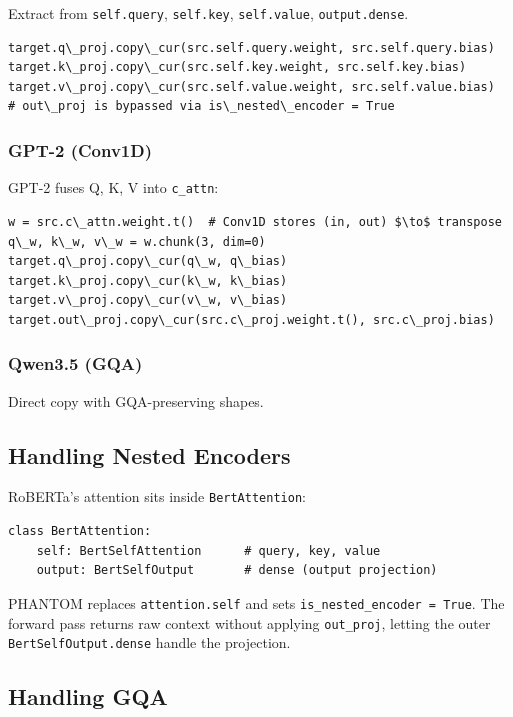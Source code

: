 Extract from \texttt{self.query}, \texttt{self.key}, \texttt{self.value}, \texttt{output.dense}.

\begin{lstlisting}
target.q\_proj.copy\_cur(src.self.query.weight, src.self.query.bias)
target.k\_proj.copy\_cur(src.self.key.weight, src.self.key.bias)
target.v\_proj.copy\_cur(src.self.value.weight, src.self.value.bias)
# out\_proj is bypassed via is\_nested\_encoder = True
\end{lstlisting}

\subsubsection{GPT-2 (Conv1D)}

GPT-2 fuses Q, K, V into \texttt{c\_attn}:

\begin{lstlisting}
w = src.c\_attn.weight.t()  # Conv1D stores (in, out) $\to$ transpose
q\_w, k\_w, v\_w = w.chunk(3, dim=0)
target.q\_proj.copy\_cur(q\_w, q\_bias)
target.k\_proj.copy\_cur(k\_w, k\_bias)
target.v\_proj.copy\_cur(v\_w, v\_bias)
target.out\_proj.copy\_cur(src.c\_proj.weight.t(), src.c\_proj.bias)
\end{lstlisting}

\subsubsection{Qwen3.5 (GQA)}

Direct copy with GQA-preserving shapes.

\subsection{Handling Nested Encoders}

RoBERTa's attention sits inside \texttt{BertAttention}:

\begin{lstlisting}
class BertAttention:
    self: BertSelfAttention      # query, key, value
    output: BertSelfOutput       # dense (output projection)
\end{lstlisting}

PHANTOM replaces \texttt{attention.self} and sets \texttt{is\_nested\_encoder = True}. The 
forward pass returns raw context without applying \texttt{out\_proj}, letting the 
outer \texttt{BertSelfOutput.dense} handle the projection.

\subsection{Handling GQA}

